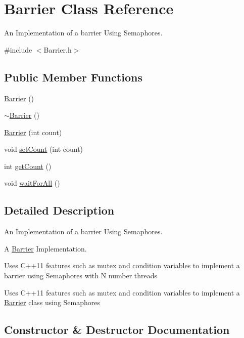 \hypertarget{class_barrier}{}\section{Barrier Class Reference}
\label{class_barrier}


An Implementation of a barrier Using Semaphores.  




{\ttfamily \#include $<$Barrier.\+h$>$}

\subsection*{Public Member Functions}
\begin{DoxyCompactItemize}
\item 
\hyperlink{class_barrier_a462a2435e07b6fabc0265011f03310ee}{Barrier} ()
\item 
\hyperlink{class_barrier_a401f40e73302009b305904ffc7825304}{$\sim$\+Barrier} ()
\item 
\hyperlink{class_barrier_a68730c862911d37696957056595aa604}{Barrier} (int count)
\item 
void \hyperlink{class_barrier_ab999e172844330d8b9a1c13f3766959d}{set\+Count} (int count)
\item 
int \hyperlink{class_barrier_a471bfe5ce54384baa7dbd195ae3a7b30}{get\+Count} ()
\item 
void \hyperlink{class_barrier_a59b259f25f6acdc5f943398035d2d87a}{wait\+For\+All} ()
\end{DoxyCompactItemize}


\subsection{Detailed Description}
An Implementation of a barrier Using Semaphores. 

A \hyperlink{class_barrier}{Barrier} Implementation.

Uses C++11 features such as mutex and condition variables to implement a barrier using Semaphores with N number threads

Uses C++11 features such as mutex and condition variables to implement a \hyperlink{class_barrier}{Barrier} class using Semaphores 

\subsection{Constructor \& Destructor Documentation}
